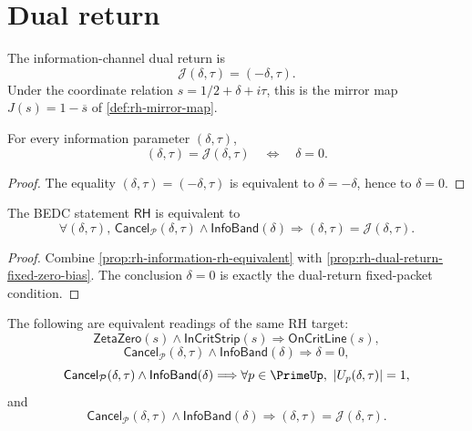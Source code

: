 \section{Dual return}
\label{sec:rh-information-dual-return}

\begin{definition}
\label{def:rh-information-dual-return}
The information-channel dual return is
$$
\mathcal J(\delta,\tau)=(-\delta,\tau).
$$
Under the coordinate relation $s=1/2+\delta+i\tau$, this is the mirror map
$J(s)=1-\overline{s}$ of \autoref{def:rh-mirror-map}.
\end{definition}

\begin{proposition}
\label{prop:rh-dual-return-fixed-zero-bias}
For every information parameter $(\delta,\tau)$,
$$
(\delta,\tau)=\mathcal J(\delta,\tau)
\quad\Longleftrightarrow\quad
\delta=0.
$$
\end{proposition}

\begin{proof}
The equality $(\delta,\tau)=(-\delta,\tau)$ is equivalent to
$\delta=-\delta$, hence to $\delta=0$.
\end{proof}

\begin{corollary}
\label{cor:rh-information-fixed-point-form}
The BEDC statement $\mathsf{RH}$ is equivalent to
$$
\forall(\delta,\tau),\,
\mathsf{Cancel}_{\mathcal P}(\delta,\tau)
\wedge
\mathsf{InfoBand}(\delta)
\Longrightarrow
(\delta,\tau)=\mathcal J(\delta,\tau).
$$
\end{corollary}

\begin{proof}
Combine \autoref{prop:rh-information-rh-equivalent} with
\autoref{prop:rh-dual-return-fixed-zero-bias}.  The conclusion
$\delta=0$ is exactly the dual-return fixed-packet condition.
\end{proof}

\begin{theorem}
\label{thm:rh-information-channel-normal-form}
The following are equivalent readings of the same RH target:
$$
\mathsf{ZetaZero}(s)\wedge\mathsf{InCritStrip}(s)
\Longrightarrow
\mathsf{OnCritLine}(s),
$$
$$
\mathsf{Cancel}_{\mathcal P}(\delta,\tau)
\wedge
\mathsf{InfoBand}(\delta)
\Longrightarrow
\delta=0,
$$
$$
\mathsf{Cancel}_{\mathcal P}(\delta,\tau)
\wedge
\mathsf{InfoBand}(\delta)
\Longrightarrow
\forall p\in\PrimeUp,\ |U_p(\delta,\tau)|=1,
$$
and
$$
\mathsf{Cancel}_{\mathcal P}(\delta,\tau)
\wedge
\mathsf{InfoBand}(\delta)
\Longrightarrow
(\delta,\tau)=\mathcal J(\delta,\tau).
$$
\end{theorem}


